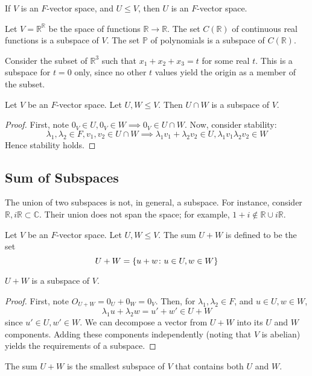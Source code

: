 \begin{proposition}
If \( V \) is an \( F \)-vector space, and \( U \leq V \), then \( U \) is an \( F \)-vector space.
\end{proposition}

\begin{example}
Let \( V = \mathbb R^{\mathbb R} \) be the space of functions \( \mathbb R \to \mathbb R \).
The set \( C(\mathbb R) \) of continuous real functions is a subspace of \( V \).
The set \( \mathbb P \) of polynomials is a subspace of \( C(\mathbb R) \).
\end{example}
\begin{example}
Consider the subset of \( \mathbb R^3 \) such that \( x_1 + x_2 + x_3 = t \) for some real \( t \).
This is a subspace for \( t = 0 \) only, since no other \( t \) values yield the origin as a member of the subset.
\end{example}

\begin{proposition}
Let \( V \) be an \( F \)-vector space.
Let \( U, W \leq V \).
Then \( U \cap W \) is a subspace of \( V \).
\end{proposition}
\begin{proof}
First, note \( 0_V \in U, 0_V \in W \implies 0_V \in U \cap W \).
Now, consider stability:
\[ \lambda_1, \lambda_2 \in F, v_1, v_2 \in U \cap W \implies \lambda_1 v_1 + \lambda_2 v_2 \in U, \lambda_1 v_1 \lambda_2 v_2 \in W \]
Hence stability holds.
\end{proof}

\subsection{Sum of Subspaces}
\begin{remark}
The union of two subspaces is not, in general, a subspace.
For instance, consider \( \mathbb R, i\mathbb R \subset \mathbb C \).
Their union does not span the space; for example, \( 1 + i \notin \mathbb R \cup i\mathbb R \).
\end{remark}

\begin{definition}
Let \( V \) be an \( F \)-vector space.
Let \( U, W \leq V \).
The sum \( U + W \) is defined to be the set
\[ U + W = \qty{ u + w \colon u \in U, w \in W } \]
\end{definition}
\begin{proposition}
\( U + W \) is a subspace of \( V \).
\end{proposition}
\begin{proof}
First, note \( O_{U+W} = 0_U + 0_W = 0_V \).
Then, for \( \lambda_1, \lambda_2 \in F \), and \( u \in U, w \in W \),
\[ \lambda_1 u + \lambda_2 w = u' + w' \in U + W \]
since \( u' \in U, w' \in W \).
We can decompose a vector from \( U + W \) into its \( U \) and \( W \) components.
Adding these components independently (noting that \( V \) is abelian) yields the requirements of a subspace.
\end{proof}
\begin{proposition}
The sum \( U + W \) is the smallest subspace of \( V \) that contains both \( U \) and \( W \).
\end{proposition}

